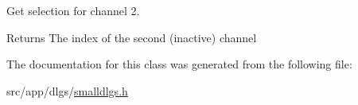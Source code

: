 Get selection for channel 2. 

\begin{DoxyReturn}{Returns}
The index of the second (inactive) channel 
\end{DoxyReturn}


The documentation for this class was generated from the following file:\begin{DoxyCompactItemize}
\item 
src/app/dlgs/\hyperlink{smalldlgs_8h}{smalldlgs.h}\end{DoxyCompactItemize}
